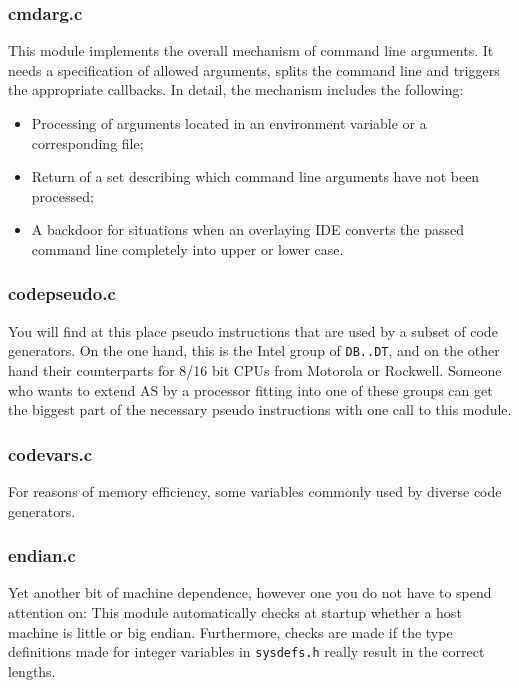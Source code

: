 \documentclass[12pt,twoside]{report}
\newcommand{\tty}[1]{{\tt #1}}
\begin{document}
\subsubsection{cmdarg.c}

This module implements the overall mechanism of command line arguments. 
It needs a specification of allowed arguments, splits the command line and
triggers the appropriate callbacks.   In detail, the mechanism includes
the following:
\begin{itemize}
\item{Processing of arguments located in an environment variable or
      a corresponding file;}
\item{Return of a set describing which command line arguments have not 
      been processed;}
\item{A backdoor for situations when an overlaying IDE converts the passed
      command line completely into upper or lower case.}
\end{itemize}

\subsubsection{codepseudo.c}

You will find at this place pseudo instructions that are used by
a subset of code generators.  On the one hand, this is the Intel group of
\tty{DB..DT}, and on the other hand their counterparts for 8/16 bit CPUs
from Motorola or Rockwell.  Someone who wants to extend AS by a
processor fitting into one of these groups can get the biggest part
of the necessary pseudo instructions with one call to this module.

\subsubsection{codevars.c}

For reasons of memory efficiency, some variables commonly used by diverse
code generators.

\subsubsection{endian.c}

Yet another bit of machine dependence, however one you do not have to
spend attention on: This module automatically checks at startup whether
a host machine is little or big endian.  Furthermore, checks are made if
the type definitions made for integer variables in {\tt sysdefs.h} really
result in the correct lengths.
\end{document}
